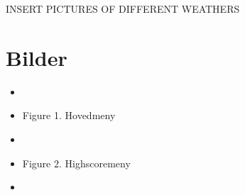 \documentclass[paper=a4]{article}
\begin{document}
INSERT PICTURES OF DIFFERENT WEATHERS
\newpage
\section{Bilder}
	\begin{center}
	{\renewcommand\labelitemi{}
		\begin{itemize}
			\item{}
			\item {\hfil Figure 1. Hovedmeny} 
			\bigskip
			\bigskip
			\bigskip
			\item{}
			\item {\hfil Figure 2. Highscoremeny}
			\bigskip
			\bigskip
			\bigskip
			\item{}

\end{itemize}}
\end{center}
\end{document}

